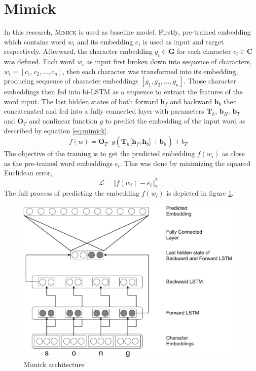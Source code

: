 \section{Mimick}
    In this research, \textsc{Mimick} is used as baseline model.
    Firstly, pre-trained embedding which contains word $w_i$ and its
    embedding $e_i$ is used as input and target respectively.
    Afterward, the character embedding $g_i \in \mathbf{G}$ for each
    character $c_i \in \mathbf{C}$ was defined. Each word $w_i$ as
    input first broken down into sequence of characters, $w_i = [c_1,
    c_2, \dots, c_n]$, then each character was transformed into its
    embedding, producing sequence of character embeddings $[g_1, g_2,
    \dots, g_n]$. Those character embeddings then fed into bi-LSTM as
    a sequence to extract the features of the word input. The last
    hidden states of both forward $\mathbf{h}_f$ and backward
    $\mathbf{h}_b$ then concatenated and fed into a fully connected
    layer with parameters $\mathbf{T}_h$, $\mathbf{b}_H$,
    $\mathbf{b}_T$ and $\mathbf{O}_T$ and nonlinear function $g$ to
    predict the embedding of the input word as described by equation
    \ref{eq:mimick}.
    \begin{equation}
        \label{eq:mimick}
        f(w) = \mathbf{O}_{T} \cdot g(\mathbf{T}_h \dot [\mathbf{h}_f;
        \mathbf{h}_b] + \mathbf{b}_h) + b_T
    \end{equation}
    The objective of the training is to get the predicted embedding
    $f(w_i)$ as close as the pre-trained word embeddings $e_i$. This
    was done by minimizing the squared Euclidean error,
    \begin{equation}
        \label{eq:mimickloss}
        \mathcal{L} = \Vert f(w_i) - e_i \Vert_2^2
    \end{equation}
    The full process of predicting the embedding $f(w_i)$ is depicted
    in figure \ref{fig:mimick}.
    \begin{figure}
        \centering
        \includegraphics[width=.8\linewidth]{images/mimick.pdf}
        \caption{Mimick architecture}
        \label{fig:mimick}
    \end{figure}

